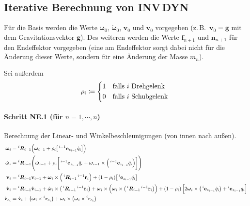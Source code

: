 \documentclass[a4paper, 11pt, accentcolor = tud3b]{tudreport}
\newcommand{\inreferenceto}[2]{\prescript{#1}{}{#2}}
\newcommand{\mat}[1]{\boldsymbol{#1}}
\renewcommand{\vec}[1]{\boldsymbol{\mathbf{#1}}}
\newcommand{\zB}{z.\,B.~}
\begin{document}
			\subsection{Iterative Berechnung von INV\,DYN}
				Für die Basis werden die Werte \( \vec{\omega}_0 \), \( \dot{\vec{\omega}}_0 \), \( \vec{v}_0 \) und \( \vec{\dot{v}}_0 \) vorgegeben (\zB \( \vec{\dot{v}}_0 = \vec{g} \) mit dem Gravitationsvektor \(\vec{g}\)). Des weiteren werden die Werte \( \vec{f}_{n + 1} \) und \( \vec{n}_{n + 1} \) für den Endeffektor vorgegeben (eine am Endeffektor sorgt dabei nicht für die Änderung dieser Werte, sondern für eine Änderung der Masse \(m_n\)).
				
				Sei außerdem
				\begin{equation*}
					\rho_i \coloneqq
						\begin{cases*}
							1 & falls \(i\) Drehgelenk \\
							0 & falls \(i\) Schubgelenk
						\end{cases*}
				\end{equation*}
				
				\paragraph{Schritt NE.1 (für \( n = 1, \cdots, n \))}
					Berechnung der Linear- und Winkelbeschleunigungen (von innen nach außen).
					\begin{align*}
						\vec{\omega}_i &= \inreferenceto{i}{\mat{R}}_{i - 1} \Big( \vec{\omega}_{i - 1} + \rho_i \big[ \inreferenceto{i - 1}{\vec{e}}_{z_{i - 1}} \dot{q}_i \big] \Big) \\
						\dot{\vec{\omega}}_i &= \inreferenceto{i}{\mat{R}}_{i - 1} \Bigg( \dot{\vec{\omega}}_{i - 1} + \rho_i \bigg[ \inreferenceto{i - 1}{\vec{e}}_{z_{i - 1}} \ddot{q}_i + \vec{\omega}_{i - 1} \times \Big( \inreferenceto{i - 1}{\vec{e}}_{z_{i - 1}} \dot{q}_i \Big) \bigg] \Bigg) \\
						\vec{v}_i &= \inreferenceto{i}{\mat{R}}_{i - 1} \vec{v}_{i - 1} + \vec{\omega}_i \times \Big( \inreferenceto{i}{\mat{R}}_{i - 1} \inreferenceto{i - 1}{\vec{r}}_i \Big) + (1 - \rho_i) \big[ \inreferenceto{i}{\vec{e}}_{z_{i - 1}} \dot{q}_i \big] \\
						\vec{\dot{v}}_i &= \inreferenceto{i}{\mat{R}}_{i - 1} \vec{\dot{v}}_{i - 1} + \dot{\vec{\omega}}_i \times \big( \inreferenceto{i}{\mat{R}}_{i - 1} \inreferenceto{i - 1}{\vec{r}}_i \big) + \vec{\omega}_i \times \Big( \vec{\omega}_i \times \big( \inreferenceto{i}{\mat{R}}_{i - 1} \inreferenceto{i - 1}{\vec{r}}_i \big) \Big) + (1 - \rho_i) \, \Big[ 2\vec{\omega}_i \times \big( \inreferenceto{i}{\vec{e}}_{z_{i - 1}} \dot{q}_i \big) + \inreferenceto{i}{\vec{e}}_{z_{i - 1}} \ddot{q}_i \Big] \\
						\vec{\dot{v}}_{c_i} &= \vec{\dot{v}}_i + \big(\dot{\vec{\omega}}_i \times \inreferenceto{i}{\vec{r}}_{c_i}\big) + \vec{\omega}_i \times \big( \vec{\omega}_i \times \inreferenceto{i}{\vec{r}}_{c_i} \big)
					\end{align*}
				
\end{document}

